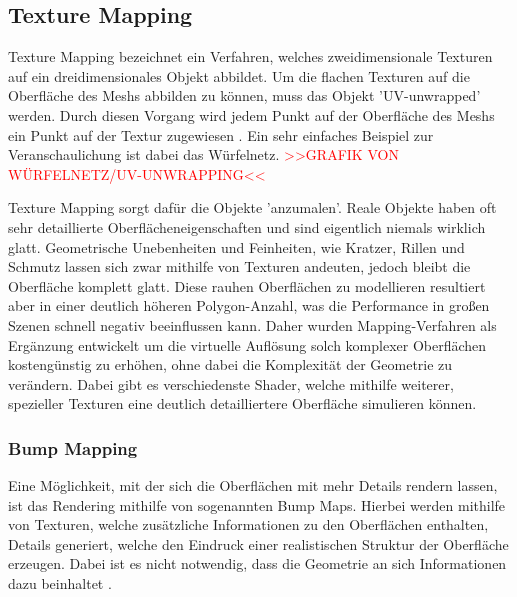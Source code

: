 \subsection{Texture Mapping}

Texture Mapping bezeichnet ein Verfahren, welches zweidimensionale Texturen auf ein dreidimensionales Objekt
abbildet. Um die flachen Texturen auf die Oberfläche des Meshs abbilden zu können, muss das Objekt 'UV-unwrapped' werden.
Durch diesen Vorgang wird jedem Punkt auf der Oberfläche des Meshs ein Punkt auf der Textur zugewiesen \parencite{Catmull1974} \parencite{Blinn1976}.
Ein sehr einfaches Beispiel zur Veranschaulichung ist dabei das Würfelnetz.
\textcolor{red}{>>GRAFIK VON WÜRFELNETZ/UV-UNWRAPPING<<}

Texture Mapping sorgt dafür die Objekte 'anzumalen'.
Reale Objekte haben oft sehr detaillierte Oberflächeneigenschaften und sind eigentlich niemals wirklich glatt.
Geometrische Unebenheiten und Feinheiten, wie Kratzer, Rillen und Schmutz lassen sich zwar mithilfe von
Texturen andeuten, jedoch bleibt die Oberfläche komplett glatt. Diese rauhen Oberflächen zu modellieren resultiert
aber in einer deutlich höheren Polygon-Anzahl, was die Performance in großen Szenen schnell negativ beeinflussen kann.
Daher wurden Mapping-Verfahren als Ergänzung entwickelt um die virtuelle Auflösung
solch komplexer Oberflächen kostengünstig zu erhöhen, ohne dabei die Komplexität der Geometrie zu verändern.
Dabei gibt es verschiedenste Shader, welche mithilfe weiterer, spezieller Texturen eine deutlich detailliertere
Oberfläche simulieren können.


\subsubsection{Bump Mapping}

Eine Möglichkeit, mit der sich die Oberflächen mit mehr Details rendern lassen, ist das Rendering
mithilfe von sogenannten Bump Maps.
Hierbei werden mithilfe von Texturen, welche zusätzliche Informationen zu den Oberflächen enthalten,
Details generiert, welche den Eindruck einer realistischen Struktur der Oberfläche erzeugen.
Dabei ist es nicht notwendig, dass die Geometrie an sich Informationen dazu beinhaltet \parencite{Blinn1978}.

